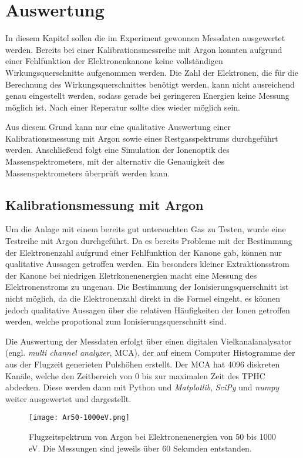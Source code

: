 \chapter{Auswertung}
\label{chap:Auswertung}
In diesem Kapitel sollen die im Experiment gewonnen Messdaten ausgewertet werden. Bereits bei einer Kalibrationsmessreihe mit Argon konnten aufgrund einer Fehlfunktion der Elektronenkanone keine vollständigen Wirkungsquerschnitte aufgenommen werden. Die Zahl der Elektronen, die für die Berechnung des Wirkungsquerschnittes benötigt werden, kann nicht ausreichend genau eingestellt werden, sodass gerade bei geringeren Energien keine Messung möglich ist. Nach einer Reperatur sollte dies wieder möglich sein. 

Aus diesem Grund kann nur eine qualitative Auswertung einer Kalibrationsmessung mit Argon sowie eines Restgasspektrums durchgeführt werden. Anschließend folgt eine Simulation der Ionenoptik des Massenspektrometers, mit der alternativ die Genauigkeit des Massenspektrometers überprüft werden kann.

\section{Kalibrationsmessung mit Argon}
Um die Anlage mit einem bereits gut untersuchten Gas zu Testen, wurde eine Testreihe mit Argon durchgeführt. Da es bereits Probleme mit der Bestimmung der Elektronenzahl aufgrund einer Fehlfunktion der Kanone gab, können nur qualitative Aussagen getroffen werden. Ein besonders kleiner Extraktionsstrom der Kanone bei niedrigen Eletrkonenenergien macht eine Messung des Elektronenstroms zu ungenau. Die Bestimmung der Ionisierungsquerschnitt ist nicht möglich, da die Elektronenzahl direkt in die Formel eingeht, es können jedoch qualitative Aussagen über die relativen Häufigkeiten der Ionen getroffen werden, welche propotional zum Ionisierungsquerschnitt sind.

Die Auswertung der Messdaten erfolgt über einen digitalen Vielkanalanalysator (engl. \textit{multi channel analyzer}, MCA), der auf einem Computer Histogramme der aus der Flugzeit generieten Pulshöhen erstellt. Der MCA hat 4096 diskreten Kanäle, welche den Zeitbereich von 0 bis zur maximalen Zeit des TPHC abdecken. Diese werden dann mit Python und \textit{Matplotlib}, \textit{SciPy} und \textit{numpy} weiter ausgewertet und dargestellt. 

\begin{figure}
    \centering
    \hspace{-1.6cm}\texttt{[image: Ar50-1000eV.png]}
    \caption[Flugzeitspektrum von Argon bei Elektronenenergien von 50 bis 1000 eV]{Flugzeitspektrum von Argon bei Elektronenenergien von 50 bis 1000 eV. Die Messungen sind jeweils über 60 Sekunden entstanden.}
    \label{fig:ar}
\end{figure}

